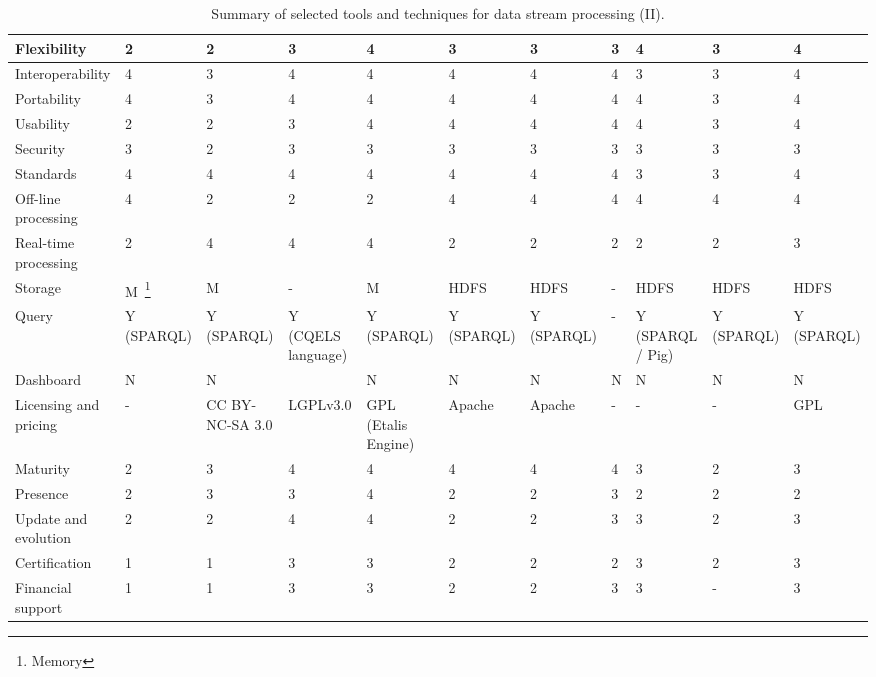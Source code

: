 \begin{sidewaystable}[!ht]
\begin{center}
\begin{tabular}[c]{|p{1.7cm}|p{1.5cm}|p{1.5cm}|p{1.5cm}|p{1.5cm}|p{1.5cm}|p{1.5cm}|p{1.5cm}|p{1.5cm}|p{1.5cm}|p{1.5cm}|}
  Flexibility & 2 & 2  & 3  & 4 & 3 & 3 & 3 & 4 & 3 & 4\\ \hline  
  Interoperability & 4 & 3  & 4 &4  & 4 & 4 & 4 & 3 & 3 & 4\\ \hline  
  Portability & 4 & 3  & 4 & 4 & 4 & 4 & 4 & 4 & 3 &4 \\ \hline  
  Usability & 2 & 2  & 3 & 4 & 4 & 4 & 4 & 4 & 3 & 4\\ \hline  
  Security & 3 & 2  & 3 & 3 & 3 & 3 & 3 & 3 & 3 & 3\\ \hline  
  Standards & 4 & 4  & 4 & 4 & 4 & 4 & 4 & 3 & 3 & 4\\ \hline  
  Off-line processing & 4 & 2  & 2 & 2 & 4 & 4 & 4 & 4 & 4 & 4\\ \hline  
  Real-time processing & 2 & 4  & 4 & 4 & 2 & 2 & 2 & 2 & 2 & 3\\ \hline  
  Storage &  M~\footnote{Memory}&M  & - & M &  HDFS & HDFS & - & HDFS & HDFS &HDFS \\ \hline  
  Query & Y (SPARQL) & Y (SPARQL)  & Y (CQELS language) & Y (SPARQL) & Y (SPARQL) & Y (SPARQL) & - & Y (SPARQL / Pig) & Y (SPARQL) & Y (SPARQL)\\ \hline  
  Dashboard & N & N &  & N & N & N & N & N & N & N\\ \hline  
  Licensing and pricing & - & CC BY-NC-SA 3.0  & LGPLv3.0 & GPL (Etalis Engine) & Apache & Apache & - & -  & - & GPL \\ \hline  
  Maturity & 2 &  3 & 4 & 4 & 4 & 4 & 4  & 3 & 2 & 3\\ \hline  
  Presence & 2 &  3 & 3 & 4 & 2 & 2  & 3 & 2 & 2 & 2\\ \hline  
  Update and evolution & 2 & 2  & 4 & 4 & 2 & 2 & 3 & 3 & 2 & 3\\ \hline  
  Certification & 1 & 1  & 3 & 3 & 2 & 2 & 2 & 3 & 2 & 3\\ \hline  
  Financial support & 1 & 1  & 3 & 3 & 2 & 2 & 3 & 3 & - & 3\\ \hline  

\hline
\end{tabular}
\caption{Summary of selected tools and techniques for data stream processing (II).}\label{table:tools-ii}
  \end{center}
\end{sidewaystable} 

\clearpage

